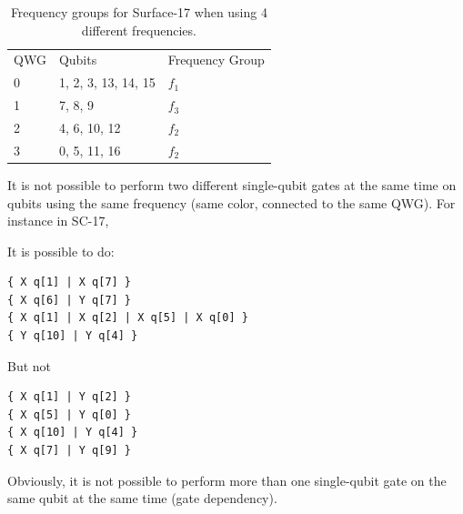 \begin{table}[h!]


\caption{\label{T3}
Frequency groups for Surface-17 when using 4 different frequencies.}
\centering
\begin{tabular}{lll}
 & \\
\hline
QWG & Qubits & Frequency Group\\
\hline
\cellcolor{red!25}  0 & \cellcolor{red!25} 1, 2, 3, 13, 14, 15 & \cellcolor{red!25} $f_1$\\
\cellcolor{pink!25}  1 & \cellcolor{pink!25} 7, 8, 9 & \cellcolor{pink!25} $f_3$\\
\cellcolor{green!25}  2 & \cellcolor{green!25} 4, 6, 10, 12 & \cellcolor{green!25} $f_2$\\
\cellcolor{cyan!25}  3 & \cellcolor{cyan!25} 0, 5, 11, 16 & \cellcolor{cyan!25} $f_2$\\
\hline
\end{tabular}
\end{table}


\newpage
It is not possible to perform two different single-qubit gates at the same time on qubits using the same frequency (same color, connected to the same QWG). For instance in SC-17,

\begin{minipage}[t]{.45\textwidth}

It is possible to do:

\begin{verbatim}
{ X q[1] | X q[7] }
{ X q[6] | Y q[7] }
{ X q[1] | X q[2] | X q[5] | X q[0] }
{ Y q[10] | Y q[4] }

\end{verbatim}

\end{minipage}
\hfill %
\begin{minipage}[t]{.45\textwidth}

But not

\begin{verbatim}
{ X q[1] | Y q[2] }
{ X q[5] | Y q[0] }
{ X q[10] | Y q[4] }
{ X q[7] | Y q[9] }
\end{verbatim}

\end{minipage}

Obviously, it is not possible to perform more than one single-qubit gate on the same qubit at the same time (gate dependency).

